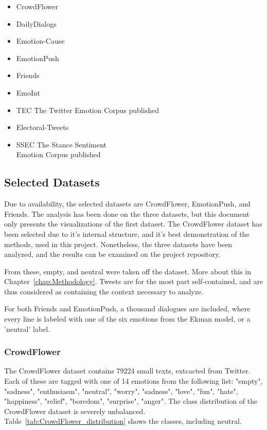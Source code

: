 \begin{itemize}
  \item CrowdFlower %
  \item DailyDialogs~\cite{li2017dailydialog} %
  \item Emotion-Cause~\cite{ghazi2015detecting} %
  \item EmotionPush~\cite{huang2018emotionpush} %
  \item Friends~\cite{chen2018emotionlines} %
  \item EmoInt~\cite{MohammadB17starsem} %
  \item TEC The Twitter Emotion Corpus published~\cite{mohammad2012emotional} %
  \item Electoral-Tweets~\cite{mohammad2014semantic} %
  \item SSEC The Stance Sentiment \\ Emotion Corpus published~\cite{schuff2017annotation} %
\end{itemize}

\subsection{Selected Datasets}\label{sub:Selected Datasets}
Due to availability, the selected datasets are CrowdFlower, EmotionPush, and Friends. The analysis has been done on the three datasets, but this document only presents the visualizations of the first dataset. The CrowdFlower dataset has been selected due to it's internal structure, and it's best demonstration of the methods, used in this project. Nonetheless, the three datasets have been analyzed, and the results can be examined on the project repository.

From these, empty, and neutral were taken off the dataset. More about this in Chapter~\ref{chap:Methodology}. Tweets are for the most part self-contained, and are thus considered as containing the context necessary to analyze.

For both Friends and EmotionPush, a thousand dialogues are included, where every line is labeled with one of the six emotions from the Ekman model, or a 'neutral' label.

\subsubsection{CrowdFlower}
The CrowdFlower dataset contains 79224 small texts, extcacted from Twitter. Each of these are tagged with one of 14 emotions from the following list: "empty", "sadness", "enthusiasm", "neutral", "worry", "sadness", "love", "fun", "hate", "happiness", "relief", "boredom", "surprise", "anger".
The class distribution of the CrowdFlower dataset is severely unbalanced. Table~\ref{tab:CrowdFlower_distribution} shows the classes, including neutral.

